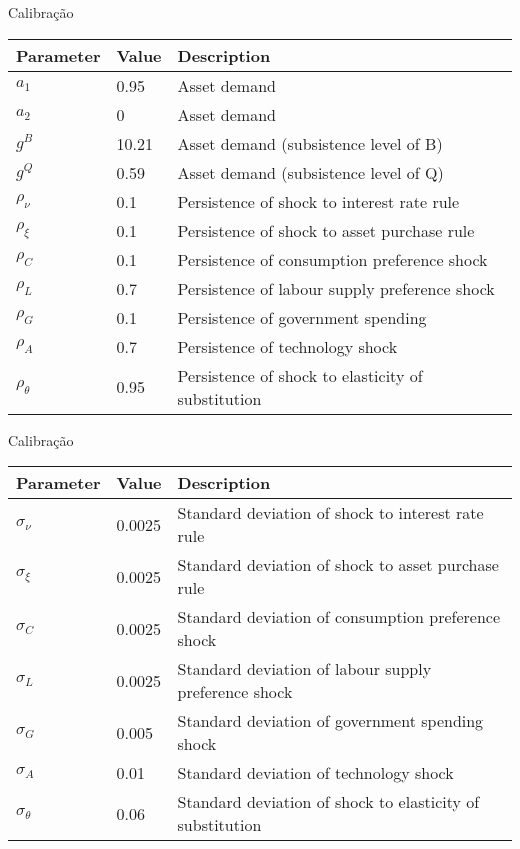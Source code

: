 \documentclass{beamer}
\begin{document}
\begin{frame}{Calibração}
    \begin{table}[h!]
        \centering
        \small
    \begin{tabular}{lll}
        \hline Parameter & Value & Description \\ \hline\hline
        $a_1$ & 0.95 & Asset demand \\
        $a_2$ & 0 & Asset demand \\
        $g^B$ & 10.21 & Asset demand (subsistence level of B) \\
        $g^Q$ & 0.59 & Asset demand (subsistence level of Q) \\
        $\rho_\nu$ & 0.1 & Persistence of shock to interest rate rule \\
        $\rho_{\xi}$ & 0.1 & Persistence of shock to asset purchase rule \\
        $\rho_C$ & 0.1 & Persistence of consumption preference shock \\
        $\rho_L$ & 0.7 & Persistence of labour supply preference shock \\
        $\rho_G$ & 0.1 & Persistence of government spending \\
        $\rho_A$ & 0.7 & Persistence of technology shock \\
        $\rho_\theta$ & 0.95 & Persistence of shock to elasticity of substitution \\
        \hline
    \end{tabular}
\end{table}
\end{frame}

\begin{frame}{Calibração}
    \begin{table}[h!]
        \centering
        \small
    \begin{tabular}{lll}
        \hline Parameter & Value & Description \\ \hline\hline
        $\sigma_\nu$ & 0.0025 & Standard deviation of shock to interest rate rule \\
        $\sigma_{\xi}$ & 0.0025 & Standard deviation of shock to asset purchase rule \\
        $\sigma_C$ & 0.0025 & Standard deviation of consumption preference shock \\
        $\sigma_L$ & 0.0025 & Standard deviation of labour supply preference shock \\
        $\sigma_G$ & 0.005 & Standard deviation of government spending shock \\
        $\sigma_A$ & 0.01 & Standard deviation of technology shock \\
        $\sigma_\theta$ & 0.06 & Standard deviation of shock to elasticity of substitution \\
        \hline
    \end{tabular}
\end{table}
\end{frame}
\end{document}
